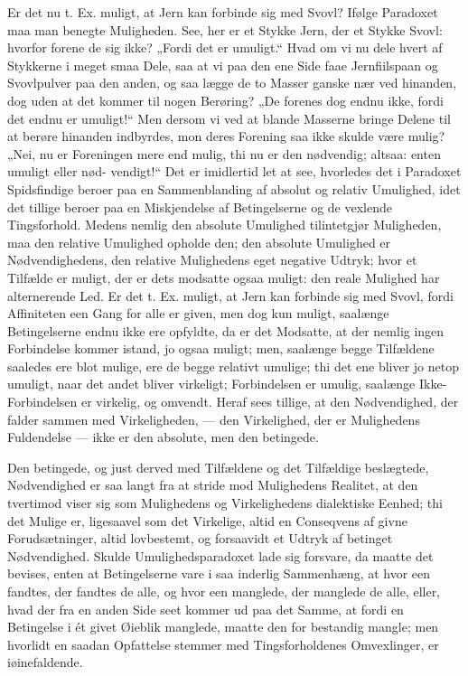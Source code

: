 \documentclass[12pt,a4paper]{book}
\begin{document}
Er det nu t. Ex. muligt, at Jern kan forbinde sig med Svovl?
Ifølge Paradoxet maa man benegte Muligheden. See, her er et Stykke
Jern, der et Stykke Svovl: hvorfor forene de sig ikke? „Fordi det
er umuligt.“ Hvad om vi nu dele hvert af Stykkerne i meget smaa
Dele, saa at vi paa den ene Side faae Jernfiilspaan og Svovlpulver
paa den anden, og saa lægge de to Masser ganske nær ved hinanden,
dog uden at det kommer til nogen Berøring? „De forenes dog endnu
ikke, fordi det endnu er umuligt!“ Men dersom vi ved at blande
Masserne bringe Delene til at berøre hinanden indbyrdes, mon deres
Forening saa ikke skulde være mulig? „Nei, nu er Foreningen mere
end mulig, thi nu er den nødvendig; altsaa: enten umuligt eller nød-
vendigt!“ Det er imidlertid let at see, hvorledes det i Paradoxet
Spidsfindige beroer paa en Sammenblanding af absolut og relativ
Umulighed, idet det tillige beroer paa en Miskjendelse af
Betingelserne og de vexlende Tingsforhold. Medens nemlig den
absolute Umulighed tilintetgjør Muligheden, maa den relative
Umulighed opholde den; den absolute Umulighed er Nødvendighedens,
den relative Mulighedens eget negative Udtryk; hvor et Tilfælde er
muligt, der er dets modsatte ogsaa muligt: den reale Mulighed har
alternerende Led. Er det t. Ex. muligt, at Jern kan forbinde sig
med Svovl, fordi Affiniteten een Gang for alle er given, men dog
kun muligt, saalænge Betingelserne endnu ikke ere opfyldte, da er
det Modsatte, at der nemlig ingen Forbindelse kommer istand, jo
ogsaa muligt; men, saalænge begge Tilfældene saaledes ere blot
mulige, ere de begge relativt umulige; thi det ene bliver jo netop
umuligt, naar det andet bliver virkeligt; Forbindelsen er umulig,
saalænge Ikke-Forbindelsen er virkelig, og omvendt. Heraf sees
tillige, at den Nødvendighed, der falder sammen med Virkeligheden,
--- den Virkelighed, der er Mulighedens Fuldendelse --- ikke er den
absolute, men den betingede.

Den betingede, og just derved med Tilfældene og det Tilfældige
beslægtede, Nødvendighed er saa langt fra at stride mod Mulighedens
Realitet, at den tvertimod viser sig som Mulighedens og
Virkelighedens dialektiske Eenhed; thi det Mulige er, ligesaavel
som det Virkelige, altid en Conseqvens af givne Forudsætninger,
altid lovbestemt, og forsaavidt et Udtryk af betinget Nødvendighed.
Skulde Umulighedsparadoxet lade sig forsvare, da maatte det
bevises, enten at Betingelserne vare i saa inderlig Sammenhæng, at
hvor een fandtes, der fandtes de alle, og hvor een manglede, der
manglede de alle, eller, hvad der fra en anden Side seet kommer ud
paa det Samme, at fordi en Betingelse i
ét givet
Øieblik manglede, maatte den for bestandig mangle; men hvorlidt en
saadan Opfattelse stemmer med Tingsforholdenes Omvexlinger, er
iøinefaldende.
\end{document}
